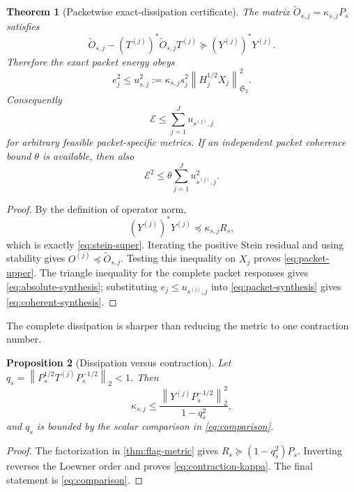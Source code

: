 \documentclass[11pt]{article}
\newtheorem{theorem}{Theorem}[section]
\newtheorem{proposition}[theorem]{Proposition}
\theoremstyle{remark}
\newcommand{\norm}[1]{\left\lVert#1\right\rVert}
\newcommand{\HS}{\mathfrak S_2}
\newcommand{\cE}{\mathcal E}
\begin{document}
\begin{theorem}[Packetwise exact-dissipation certificate]
\label{thm:packet-certificate}
The matrix $\widetilde O_{s,j}=\kappa_{s,j}P_s$ satisfies
\begin{equation}
 \widetilde O_{s,j}-(T^{(j)})^*\widetilde O_{s,j}T^{(j)}
 \succeq (Y^{(j)})^*Y^{(j)}.
 \label{eq:stein-super}
\end{equation}
Therefore the exact packet energy obeys
\begin{equation}
 \boxed{
 e_j^2\le u_{s,j}^2
 :=\kappa_{s,j}s_j^2\norm{H_j^{1/2}X_j}_{\HS}^2.}
 \label{eq:packet-upper}
\end{equation}
Consequently
\begin{equation}
 \cE\le\sum_{j=1}^Ju_{s^{(j)},j}
 \label{eq:absolute-synthesis}
\end{equation}
for arbitrary feasible packet-specific metrics.  If an independent packet
coherence bound $\theta$ is available, then also
\begin{equation}
 \cE^2\le\theta\sum_{j=1}^Ju_{s^{(j)},j}^2.
 \label{eq:coherent-synthesis}
\end{equation}
\end{theorem}

\begin{proof}
By the definition of operator norm,
\[
 (Y^{(j)})^*Y^{(j)}\preceq\kappa_{s,j}R_s,
\]
which is exactly \eqref{eq:stein-super}.  Iterating the positive Stein
residual and using stability gives
$O^{(j)}\preceq\widetilde O_{s,j}$.  Testing this inequality on $X_j$
proves \eqref{eq:packet-upper}.  The triangle inequality for the complete
packet responses gives \eqref{eq:absolute-synthesis}; substituting
$e_j\le u_{s^{(j)},j}$ into \eqref{eq:packet-synthesis} gives
\eqref{eq:coherent-synthesis}.
\end{proof}

The complete dissipation is sharper than reducing the metric to one
contraction number.

\begin{proposition}[Dissipation versus contraction]
\label{prop:dominance}
Let $q_s=\norm{P_s^{1/2}T^{(j)}P_s^{-1/2}}_2<1$.  Then
\begin{equation}
 \kappa_{s,j}
 \le\frac{\norm{Y^{(j)}P_s^{-1/2}}_2^2}{1-q_s^2},
 \label{eq:contraction-kappa}
\end{equation}
and $q_s$ is bounded by the scalar comparison in
\eqref{eq:comparison}.
\end{proposition}

\begin{proof}
The factorization in \cref{thm:flag-metric} gives
$R_s\succeq(1-q_s^2)P_s$.  Inverting reverses the Loewner order and proves
\eqref{eq:contraction-kappa}.  The final statement is
\eqref{eq:comparison}.
\end{proof}
\end{document}

